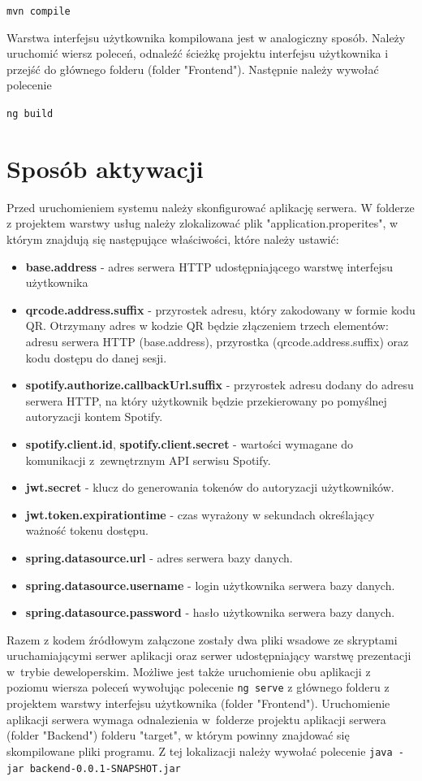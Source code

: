 \lstinline|mvn compile|


Warstwa interfejsu użytkownika kompilowana jest w analogiczny sposób. Należy uruchomić wiersz poleceń, odnaleźć ścieżkę projektu interfejsu użytkownika i przejść do głównego folderu (folder "Frontend"). Następnie należy wywołać polecenie

\lstinline|ng build|



\section{Sposób aktywacji}
Przed uruchomieniem systemu należy skonfigurować aplikację serwera. W folderze z projektem warstwy usług należy zlokalizować plik "application.properites", w którym znajdują się następujące właściwości, które należy ustawić:
\begin{itemize}
\item \textbf{base.address} - adres serwera HTTP udostępniającego warstwę interfejsu użytkownika
\item \textbf{qrcode.address.suffix} - przyrostek adresu, który zakodowany w formie kodu QR. Otrzymany adres w kodzie QR będzie złączeniem trzech elementów: adresu serwera HTTP (base.address), przyrostka (qrcode.address.suffix) oraz kodu dostępu do danej sesji.
\item \textbf{spotify.authorize.callbackUrl.suffix} - przyrostek adresu dodany do adresu serwera HTTP, na który użytkownik będzie przekierowany po pomyślnej autoryzacji kontem Spotify.
\item \textbf{spotify.client.id}, \textbf{spotify.client.secret} - wartości wymagane do komunikacji z~zewnętrznym API serwisu Spotify.
    \item \textbf{jwt.secret} - klucz do generowania tokenów do autoryzacji użytkowników.
    \item \textbf{jwt.token.expirationtime} - czas wyrażony w sekundach określający ważność tokenu dostępu.
    \item \textbf{spring.datasource.url} - adres serwera bazy danych.
    \item \textbf{spring.datasource.username} - login użytkownika serwera bazy danych.
    \item \textbf{spring.datasource.password} - hasło użytkownika serwera bazy danych.


\end{itemize}

Razem z kodem źródłowym załączone zostały dwa pliki wsadowe ze skryptami uruchamiającymi serwer aplikacji oraz serwer udostępniający warstwę prezentacji w~trybie deweloperskim. Możliwe jest także uruchomienie obu aplikacji z poziomu wiersza poleceń wywołując polecenie 
\lstinline|ng serve| z głównego folderu z projektem warstwy interfejsu użytkownika (folder "Frontend").
Uruchomienie aplikacji serwera wymaga odnalezienia w~folderze projektu aplikacji serwera (folder "Backend") folderu "target", w którym powinny znajdować się skompilowane pliki programu. Z tej lokalizacji należy wywołać polecenie \lstinline|java -jar backend-0.0.1-SNAPSHOT.jar|

